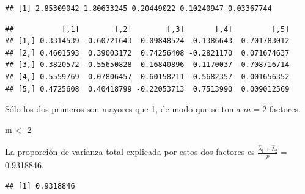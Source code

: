 \documentclass[
]{book}
\newenvironment{Shaded}{\begin{snugshade}}{\end{snugshade}}
\newcommand{\CommentTok}[1]{\textcolor[rgb]{0.56,0.35,0.01}{\textit{#1}}}
\newcommand{\DecValTok}[1]{\textcolor[rgb]{0.00,0.00,0.81}{#1}}
\newcommand{\FunctionTok}[1]{\textcolor[rgb]{0.13,0.29,0.53}{\textbf{#1}}}
\newcommand{\NormalTok}[1]{#1}
\newcommand{\OtherTok}[1]{\textcolor[rgb]{0.56,0.35,0.01}{#1}}
\newcommand{\SpecialCharTok}[1]{\textcolor[rgb]{0.81,0.36,0.00}{\textbf{#1}}}
\begin{document}
\begin{verbatim}
## [1] 2.85309042 1.80633245 0.20449022 0.10240947 0.03367744
\end{verbatim}

\begin{Shaded}
\end{Shaded}

\begin{verbatim}
##           [,1]        [,2]        [,3]       [,4]         [,5]
## [1,] 0.3314539 -0.60721643  0.09848524  0.1386643  0.701783012
## [2,] 0.4601593  0.39003172  0.74256408 -0.2821170  0.071674637
## [3,] 0.3820572 -0.55650828  0.16840896  0.1170037 -0.708716714
## [4,] 0.5559769  0.07806457 -0.60158211 -0.5682357  0.001656352
## [5,] 0.4725608  0.40418799 -0.22053713  0.7513990  0.009012569
\end{verbatim}

Sólo los dos primeros son mayores que 1, de modo que se toma \(m=2\) factores.

\begin{Shaded}
\begin{Highlighting}[]
\NormalTok{m }\OtherTok{\textless{}{-}} \DecValTok{2}
\end{Highlighting}
\end{Shaded}

La proporción de varianza total explicada por estos dos factores es \(\frac{\hat\lambda_1 + \hat\lambda_2}{p}=\) 0.9318846.

\begin{Shaded}
\end{Shaded}

\begin{verbatim}
## [1] 0.9318846
\end{verbatim}

\begin{Shaded}
\end{Shaded}
\end{document}

